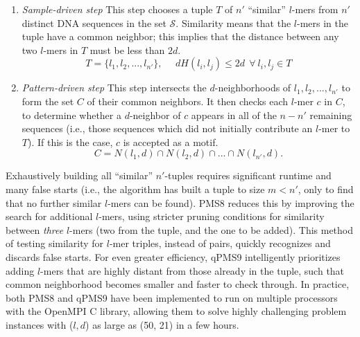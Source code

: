 \documentclass[oneside,12pt]{DISCSthesis}
\begin{document}
		\begin{enumerate}
			\item {\em Sample-driven step}\newline
			This step chooses a tuple $T$ of $n'$ ``similar'' $l$-mers from $n'$ distinct DNA sequences in the set $\mathcal{S}$. Similarity means that the $l$-mers in the tuple have a common neighbor; this implies that the distance between any two $l$-mers in $T$ must be less than $2d$.
			\begin{equation} T = \{l_{1}, l_{2}, ..., l_{n'}\},\ \ \ \ \ \ 
			dH(l_{i}, l_{j}) \leq 2d\ \ \forall\ l_{i}, l_{j} \in T \end{equation}

			\item {\em Pattern-driven step}\newline
			This step intersects the $d$-neighborhoods of $l_{1}, l_{2}, ..., l_{n'}$ to form the set $C$ of their common neighbors. It then checks each $l$-mer $c$ in $C$, to determine whether a $d$-neighbor of $c$ appears in all of the $n-n'$ remaining sequences (i.e., those sequences which did not initially contribute an $l$-mer to $T$). If this is the case, $c$ is accepted as a motif.
			\begin{equation} C = N(l_{1}, d) \cap N(l_{2}, d) \cap...\cap N(l_{n'}, d). \end{equation}
		\end{enumerate}
		\vspace{-5mm}
		\noindent Exhaustively building all ``similar'' $n'$-tuples requires significant runtime and many false starts (i.e., the algorithm has built a tuple to size $m < n'$, only to find that no further similar $l$-mers can be found).
		PMS8 reduces this by improving the search for additional $l$-mers, using stricter pruning conditions for similarity %
		between {\em three} $l$-mers (two from the tuple, and the one to be added). This method of testing similarity for $l$-mer triples, instead of pairs, quickly recognizes and discards false starts. For even greater efficiency, qPMS9 intelligently prioritizes adding $l$-mers that are highly distant from those already in the tuple, such that common neighborhood becomes smaller and faster to check through.
		In practice, both PMS8 and qPMS9 have been implemented to run on multiple processors with the OpenMPI C library, allowing them to solve highly challenging problem instances with ($l, d$) as large as (50, 21) in a few hours.
\end{document}
